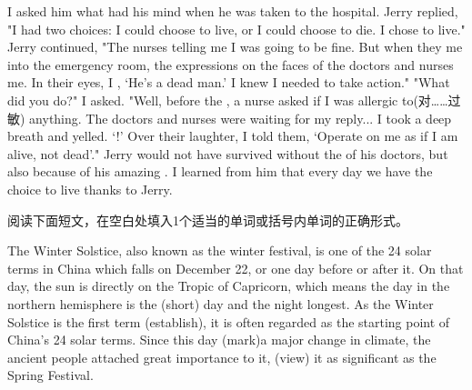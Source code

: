 \documentclass{英语试卷}
\begin{document}
\par I asked him what had  his mind when he was taken to the hospital. Jerry replied, "I had two choices: I could choose to live, or I could choose to die. I chose to live." Jerry continued, "The nurses  telling me I was going to be fine. But when they  me into the emergency room, the expressions on the faces of the doctors and nurses  me. In their eyes, I , ‘He’s a dead man.’ I knew I needed to take action." "What did you do?" I asked. "Well, before the , a nurse asked if I was allergic to(对……过敏) anything. The doctors and nurses were waiting for my reply... I took a deep breath and yelled. ‘!’ Over their laughter, I told them, ‘Operate on me as if I am alive, not dead’." Jerry would not have survived without the  of his doctors, but also because of his amazing . I learned from him that every day we have the choice to live  thanks to Jerry.\par
{}
\par 阅读下面短文，在空白处填入1个适当的单词或括号内单词的正确形式。\par
\par The Winter Solstice, also known as the winter festival, is one of the 24 solar terms in China which falls on December 22, or one day before or after it. On that day, the sun is directly on the Tropic of Capricorn, which means the day in the northern hemisphere is the  (short) day and the night longest. As the Winter Solstice is the first term (establish), it is often regarded as the starting point of China's 24 solar terms. Since this day (mark)a major change in climate, the ancient people attached great importance to it, (view) it as significant as the Spring Festival.\par
\end{document}
